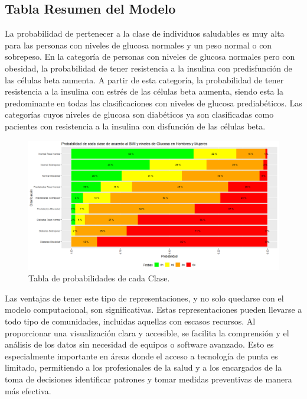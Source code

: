 \subsection{Tabla Resumen del Modelo}

La probabilidad de pertenecer a la clase de individuos saludables es muy alta para las personas con niveles de glucosa normales y un peso normal o con sobrepeso. En la categoría de personas con niveles de glucosa normales pero con obesidad, la probabilidad de tener resistencia a la insulina con predisfunción de las células beta aumenta. A partir de esta categoría, la probabilidad de tener resistencia a la insulina con estrés de las células beta aumenta, siendo esta la predominante en todas las clasificaciones con niveles de glucosa prediabéticos. Las categorías cuyos niveles de glucosa son diabéticos ya son clasificadas como pacientes con resistencia a la insulina con disfunción de las células beta.


\begin{figure}[H]

    \centering
    \includegraphics[height = 12 cm, width = 0.99 \textwidth]{4img/tablaT.png}
    \caption{Tabla de probabilidades de cada Clase.}
    \label{fig:tabla4varTotal}
\end{figure}



Las ventajas de tener este tipo de representaciones, y no solo quedarse con el modelo computacional, son significativas. Estas representaciones pueden llevarse a todo tipo de comunidades, incluidas aquellas con escasos recursos. Al proporcionar una visualización clara y accesible, se facilita la comprensión y el análisis de los datos sin necesidad de equipos o software avanzado. Esto es especialmente importante en áreas donde el acceso a tecnología de punta es limitado, permitiendo a los profesionales de la salud y a los encargados de la toma de decisiones identificar patrones y tomar medidas preventivas de manera más efectiva.

